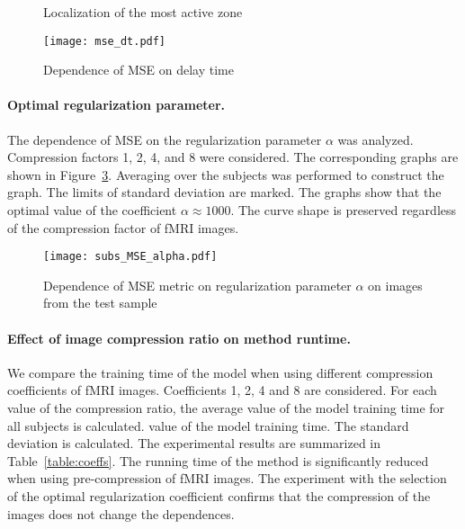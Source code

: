 \documentclass{article}
\begin{document}
\begin{figure}[h!]
	\centering
	\hfill
	\hfill
	\caption{Localization of the most active zone}
	\label{fig:local}
\end{figure}

\begin{figure}[h!]
	\centering
	\texttt{[image: mse\_dt.pdf]}
	\caption{Dependence of MSE on delay time}
	\label{fig:mse-dt}
\end{figure}

\paragraph*{Optimal regularization parameter.}

The dependence of MSE on the regularization parameter $\alpha$ was analyzed.
Compression factors 1, 2, 4, and 8 were considered.
The corresponding graphs are shown in Figure~\ref{fig:mse-alpha}.
Averaging over the subjects was performed to construct the graph.
The limits of standard deviation are marked.
The graphs show that the optimal value of the coefficient $\alpha \approx 1000$.
The curve shape is preserved regardless of the compression factor of fMRI images.

\begin{figure}[h!]
	\centering
	\texttt{[image: subs\_MSE\_alpha.pdf]}
	\caption{Dependence of MSE metric on regularization parameter $\alpha$ on images from the test sample}
	\label{fig:mse-alpha}
\end{figure}

\paragraph*{Effect of image compression ratio on method runtime.}

We compare the training time of the model when using different
compression coefficients of fMRI images. Coefficients 1, 2, 4 and 8 are considered.
For each value of the compression ratio, the average value of the model training time for all subjects is calculated.
value of the model training time. The standard deviation is calculated.
The experimental results are summarized in Table~\ref{table:coeffs}.
The running time of the method is significantly reduced when using
pre-compression of fMRI images. 
The experiment with the selection of the optimal regularization coefficient
confirms that the compression of the images does not change the dependences.
\end{document}
